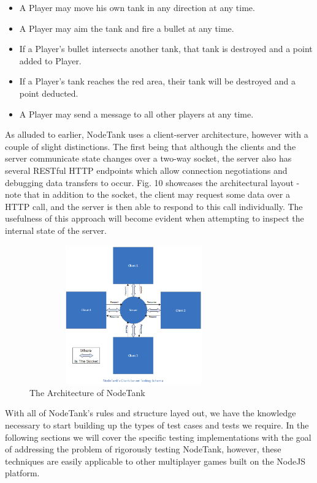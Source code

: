 \documentclass[conference]{IEEEtran}
\begin{document}
\begin{itemize}
  \item A Player may move his own tank in any direction at any time.
  \item A Player may aim the tank and fire a bullet at any time.
  \item If a Player's bullet intersects another tank, that tank is destroyed and a point added to Player.
  \item If a Player's tank reaches the red area, their tank will be destroyed and a point deducted.
  \item A Player may send a message to all other players at any time.
\end{itemize}

As alluded to earlier, NodeTank uses a client-server architecture, however with a couple of slight distinctions. The first being that although the clients and the server
communicate state changes over a two-way socket, the server also has several RESTful HTTP endpoints which allow connection negotiations and debugging data transfers to occur. 
Fig. 10 showcases the architectural layout - note that in addition to the socket, the client may request some data over a HTTP call, and the server is then able to respond to 
this call individually. The usefulness of this approach will become evident when attempting to inspect the internal state of the server. 

\begin{figure}[htbp]
\centerline{\includegraphics [width = 9cm, height = 6cm] {images/testingSchemaArch.png}}
\caption{The Architecture of NodeTank}
\end{figure}


With all of NodeTank's rules and structure layed out, we have the knowledge necessary to start building up the types of test cases and tests we require. 
In the following sections we will cover the specific testing implementations with the goal of addressing the problem of rigorously testing NodeTank, however, these techniques 
are easily applicable to other multiplayer games built on the NodeJS platform. 
\end{document}
